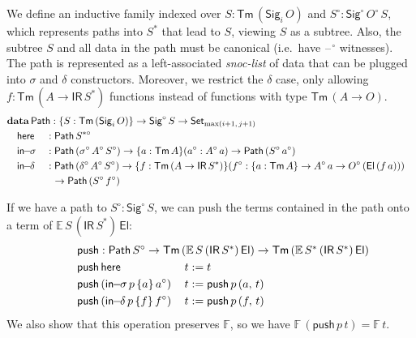 \documentclass[acmsmall,screen,review]{acmart}
\newcommand{\msf}[1]{{\mathsf{#1}}}
\newcommand{\mbf}[1]{{\mathbf{#1}}}
\newcommand{\mbb}[1]{\mathbb{#1}}
\newcommand{\push}{\mathsf{push}}
\newcommand{\data}{\mbf{data}}
\newcommand{\Set}{\msf{Set}}
\newcommand{\El}{\msf{El}}
\newcommand{\Sig}{\msf{Sig}}
\newcommand{\blank}{{\mathord{\hspace{1pt}\text{--}\hspace{1pt}}}}
\newcommand{\IR}{\msf{IR}}
\newcommand{\Tm}{\msf{Tm}}
\newcommand{\w}{\circ}
\newcommand{\Path}{\msf{Path}}
\newcommand{\here}{\msf{here}}
\newcommand{\Ssw}{S^{*\w}}
\newcommand{\insigma}{\msf{in}\!\!-\!\!\sigma}
\newcommand{\indelta}{\msf{in}\!\!-\!\!\delta}
\newcommand{\E}{\mbb{E}}
\newcommand{\F}{\mbb{F}}
\begin{document}
\begin{definition}
We define an inductive family indexed
over $S : \Tm\,(\Sig_i\,O)$ and $S^\w : \Sig^\w\,O^\w\,S$, which represents paths into $S^*$ that lead to $S$, viewing
$S$ as a subtree. Also, the subtree $S$ and all data in the path must be canonical (i.e.\ have $\blank^\w$
witnesses). The path is represented as a left-associated \emph{snoc-list} of data that can be
plugged into $\sigma$ and $\delta$ constructors. Moreover, we restrict the $\delta$ case, only
allowing $f : \Tm\,(A \to \IR\,S^*)$ functions instead of functions with type $\Tm\,(A \to O)$.
\begin{alignat*}{4}
  &\rlap{$\data\,\Path : \{S : \Tm\,(\Sig_i\,O)\} \to \Sig^\w\,S \to \Set_{\max(i+1,\,j+1)}$}\\
  &\quad \here    &&: \Path\,\Ssw\\
  &\quad \insigma &&: \Path\,(\sigma^\w\,A^\w\,S^\w) \to \{a : \Tm\,A\}(a^\w : A^\w\,a) \to \Path\,(S^\w\,a^\w) \\
  &\quad \indelta &&: \Path\,(\delta^\w\,A^\w\,S^\w) \to \{f : \Tm\,(A \to \IR\,S^*)\}(f^\w : \{a : \Tm\,A\} \to A^\w\,a \to O^\w\,(\El\,(f\,a)))\\
  &               && \hspace{0.6em} \to \Path\,(S^\w\,f^\w)
\end{alignat*}


If we have a path to $S^\w : \Sig^\w\,S$, we can push the terms contained in the path onto a
term of $\E\,S\,(\IR\,S^*)\,\El$:
\begin{alignat*}{4}
  & \hspace{-6em}\rlap{$\push : \Path\,S^\w \to \Tm\,(\E\,S\,(\IR\,S^*)\,\El) \to \Tm\,(\E\,S^*\,(\IR\,S^*)\,\El)$}\\
  & \hspace{-6em}\push\,\here\,                     &&t := t\\
  & \hspace{-6em}\push\,(\insigma\,p\,\{a\}\,a^\w)\,&&t := \push\,p\,(a,\,t)\\
  & \hspace{-6em}\push\,(\indelta\,p\,\{f\}\,f^\w)\,&&t := \push\,p\,(f,\,t)
\end{alignat*}
We also show that this operation preserves $\F$, so we have $\F\,(\push\,p\,t) = \F\,t$.
\end{definition}

\end{document}
